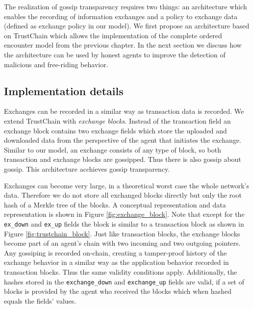 The realization of gossip transparency requires two things: an architecture which enables the 
recording of information exchanges and a policy to exchange data (defined as exchange policy in 
our model). We first propose an architecture based on TrustChain which allows the implementation 
of the complete ordered encounter model from the previous chapter. In the next section we discuss
how the architecture can be used by honest agents to improve the detection of malicious and free-riding 
behavior.

\subsection{Implementation details}
Exchanges can be recorded in a similar way as transaction data is recorded. We extend TrustChain with \textit{exchange blocks}. Instead of the transaction
field an exchange block contains two exchange fields which store the uploaded and downloaded data from the perspective of
the agent that initiates the exchange. Similar to our model, an exchange consists of any type of block, so both transaction and exchange 
blocks are gossipped. Thus there is also gossip about gossip. This architecture acchieves gossip transparency.

Exchanges can become very large, in a theoretical 
worst case the whole network's data. Therefore we do not store all exchanged blocks directly but only
the root hash of a Merkle tree of the blocks. A conceptual representation and data representation 
is shown in Figure \ref{fig:exchange_block}. Note that except for the \verb|ex_down| and \verb|ex_up|
fields the block is similar to a transaction block as shown in Figure \ref{fig:trustchain_block}. 
Just like transaction blocks, the exchange blocks become part of an agent's chain with two incoming
and two outgoing pointers. Any gossiping is recorded on-chain, creating a tamper-proof history 
of the exchange behavior in a similar way as the application behavior recorded in transaction blocks.
Thus the same validity conditions apply. Additionally, the hashes stored in the \verb|exchange_down| and \verb|exchange_up|
fields are valid, if a set of blocks is provided by the agent who received the blocks which when 
hashed equals the fields' values. 

